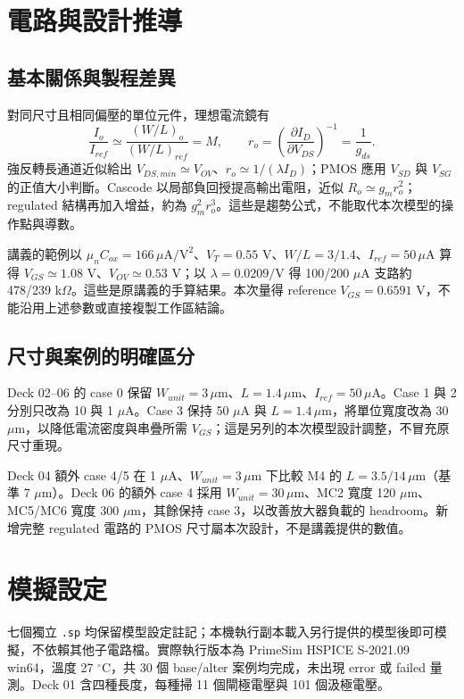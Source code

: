 \section{電路與設計推導}
\subsection{基本關係與製程差異}
對同尺寸且相同偏壓的單位元件，理想電流鏡有
\[
\frac{I_o}{I_{ref}}\simeq\frac{(W/L)_o}{(W/L)_{ref}}=M,
\qquad r_o=\left(\frac{\partial I_D}{\partial V_{DS}}\right)^{-1}=\frac{1}{g_{ds}}.
\]
強反轉長通道近似給出 $V_{DS,min}\simeq V_{OV}$、$r_o\simeq1/(\lambda I_D)$；PMOS 應用 $V_{SD}$ 與 $V_{SG}$ 的正值大小判斷。Cascode 以局部負回授提高輸出電阻，近似 $R_o\simeq g_mr_o^2$；regulated 結構再加入增益，約為 $g_m^2r_o^3$。這些是趨勢公式，不能取代本次模型的操作點與導數。

講義的範例以 $\mu_n C_{ox}=166\,\mu\mathrm{A}/\mathrm{V}^2$、$V_T=0.55$ V、$W/L=3/1.4$、$I_{ref}=50\,\mu$A 算得 $V_{GS}\simeq1.08$ V、$V_{OV}\simeq0.53$ V；以 $\lambda=0.0209/\mathrm{V}$ 得 100/200 $\mu$A 支路約 478/239 k$\Omega$。這些是原講義的手算結果。本次量得 reference $V_{GS}=0.6591$ V，不能沿用上述參數或直接複製工作區結論。

\subsection{尺寸與案例的明確區分}
Deck 02--06 的 case 0 保留 $W_{unit}=3\,\mu$m、$L=1.4\,\mu$m、$I_{ref}=50\,\mu$A。Case 1 與 2 分別只改為 10 與 1 $\mu$A。Case 3 保持 50 $\mu$A 與 $L=1.4\,\mu$m，將單位寬度改為 30 $\mu$m，以降低電流密度與串疊所需 $V_{GS}$；這是另列的本次模型設計調整，不冒充原尺寸重現。

Deck 04 額外 case 4/5 在 1 $\mu$A、$W_{unit}=3\,\mu$m 下比較 M4 的 $L=3.5/14\,\mu$m（基準 7 $\mu$m）。Deck 06 的額外 case 4 採用 $W_{unit}=30\,\mu$m、MC2 寬度 120 $\mu$m、MC5/MC6 寬度 300 $\mu$m，其餘保持 case 3，以改善放大器負載的 headroom。新增完整 regulated 電路的 PMOS 尺寸屬本次設計，不是講義提供的數值。

\section{模擬設定}
七個獨立 \texttt{.sp} 均保留模型設定註記；本機執行副本載入另行提供的模型後即可模擬，不依賴其他子電路檔。實際執行版本為 PrimeSim HSPICE S-2021.09 win64，溫度 27 $^\circ$C，共 30 個 base/alter 案例均完成，未出現 error 或 failed 量測。Deck 01 含四種長度，每種掃 11 個閘極電壓與 101 個汲極電壓。

